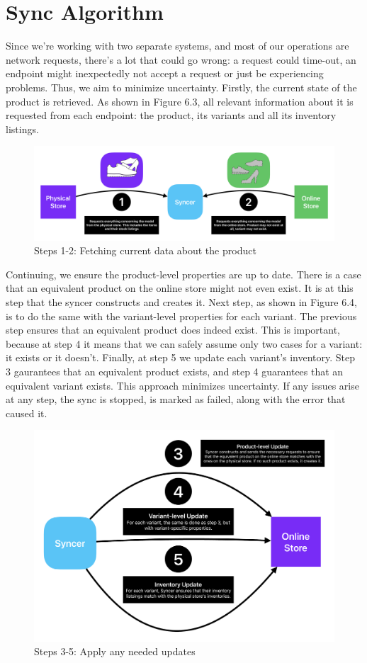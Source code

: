 \section{Sync Algorithm}
Since we're working with two separate systems, and most of our operations are network requests, there's a lot that could go wrong: a request could time-out, an endpoint might inexpectedly not accept a request or just be experiencing problems. Thus, we aim to minimize uncertainty.
Firstly, the current state of the product is retrieved. As shown in Figure 6.3, all relevant information about it is requested from each endpoint: the product, its variants and all its inventory listings.
\begin{figure}[h!]
    \centering
    \includegraphics[width=\textwidth]{media/syncer_fetch_data_black.pdf}
    \caption{Steps 1-2: Fetching current data about the product}
    \label{fig:sync1_2}
\end{figure}
Continuing, we ensure the product-level properties are up to date. There is a case that an equivalent product on the online store might not even exist. It is at this step that the syncer constructs and creates it. Next step, as shown in Figure 6.4, is to do the same with the variant-level properties for each variant. The previous step ensures that an equivalent product does indeed exist. This is important, because at step 4 it means that we can safely assume only two cases for a variant: it exists or it doesn't. Finally, at step 5 we update each variant's inventory. Step 3 gaurantees that an equivalent product exists, and step 4 guarantees that an equivalent variant exists. This approach minimizes uncertainty. If any issues arise at any step, the sync is stopped, is marked as failed, along with the error that caused it.
\begin{figure}[h!]
    \centering
    \includegraphics[width=\textwidth]{media/syncer_dosync_black.pdf}
    \caption{Steps 3-5: Apply any needed updates}
    \label{fig:sync3_5}
\end{figure}
